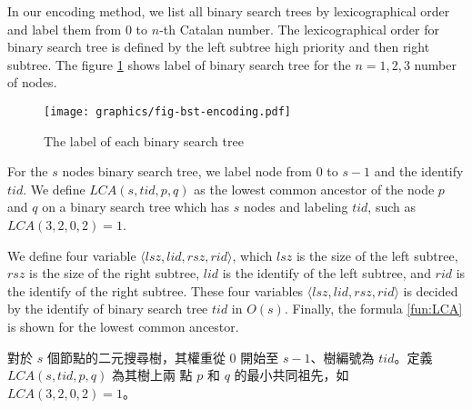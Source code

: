 In our encoding method, we list all binary search trees by
lexicographical order and label them from $0$ to $n$-th Catalan
number.  The lexicographical order for binary search tree is defined
by the left subtree high priority and then right subtree.  The figure
\ref{fig:labelingBST} shows label of binary search tree for the
$n=1,2,3$ number of nodes.

\iffalse
關於在線操作，我們從 Fischer \cite{fischer} 和 Masud \cite{masud} 的研究中，
分別得到關於笛卡爾的編碼與快取改善的技術，而這些技術都著手於離線操作，
即一開始給訂 $n$ 個元素值，並且在 $O(n)$ 時間內編碼一棵樹；
接著，再利用前處理的查找表完成極值查找。

關於快取效能，因詢問次數與元素個數相當，
故無法像 Masud \cite{masud} 的研究藉由排序編碼以減少快取未中的問題，
只能依賴數據本身的分佈和編碼之間的關聯來減少快取未中的情況。

從上述幾點觀點出發，我們提出動態的編碼方式。
算法採用字典順序的方式編碼一棵樹，優先增長左子樹，
當相同左子樹時，增長右子樹的方式進行編號，其編碼方式如圖 \ref{fig:lablingBST}。
\fi

\begin{figure}[!thb]
  \centering
  \texttt{[image: graphics/fig-bst-encoding.pdf]}
  \caption{The label of each binary search tree}
  \label{fig:labelingBST}
\end{figure}

For the $s$ nodes binary search tree, we label node from $0$ to $s-1$
and the identify $\mathit{tid}$.  We define $\mathit{LCA}(s,
\mathit{tid}, p, q)$ as the lowest common ancestor of the node $p$ and
$q$ on a binary search tree which has $s$ nodes and labeling
$\mathit{tid}$, such as $\mathit{LCA}(3, 2, 0, 2) = 1$.

We define four variable
$\langle\mathit{lsz},\mathit{lid},\mathit{rsz},\mathit{rid}\rangle$,
which $\mathit{lsz}$ is the size of the left subtree, $\mathit{rsz}$
is the size of the right subtree, $\mathit{lid}$ is the identify of
the left subtree, and $\mathit{rid}$ is the identify of the right
subtree.  These four variables
$\langle\mathit{lsz},\mathit{lid},\mathit{rsz},\mathit{rid}\rangle$ is
decided by the identify of binary search tree $\mathit{tid}$ in
$O(s)$.  Finally, the formula \ref{fun:LCA} is shown for the lowest
common ancestor.

\iffalse

對於 $s$ 個節點的二元搜尋樹，其權重從 $0$ 開始至 $s-1$、樹編號為
$\mathit{tid}$。定義 $\mathit{LCA}(s, \mathit{tid}, p, q)$ 為其樹上兩
點 $p$ 和 $q$ 的最小共同祖先，如 $\mathit{LCA}(3, 2, 0, 2) = 1$。

